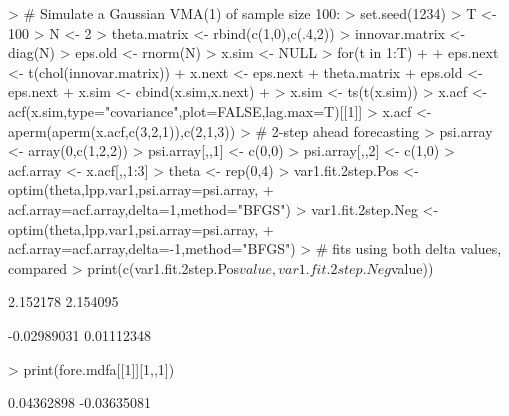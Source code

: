 \documentclass[a4paper]{book}
\begin{document}
\begin{Schunk}
\begin{Sinput}
> # Simulate a Gaussian VMA(1) of sample size 100:
> set.seed(1234)
> T <- 100
> N <- 2
> theta.matrix <- rbind(c(1,0),c(.4,2))
> innovar.matrix <- diag(N)
> eps.old <- rnorm(N)
> x.sim <- NULL
> for(t in 1:T)
+ {
+ 	eps.next <- t(chol(innovar.matrix)) %
+ 	x.next <- eps.next + theta.matrix %
+ 	eps.old <- eps.next
+ 	x.sim <- cbind(x.sim,x.next)
+ }
> x.sim <- ts(t(x.sim))
> x.acf <- acf(x.sim,type="covariance",plot=FALSE,lag.max=T)[[1]]
> x.acf <- aperm(aperm(x.acf,c(3,2,1)),c(2,1,3))
> # 2-step ahead forecasting
> psi.array <- array(0,c(1,2,2))
> psi.array[,,1] <- c(0,0)
> psi.array[,,2] <- c(1,0)
> acf.array <- x.acf[,,1:3]
> theta <- rep(0,4)
> var1.fit.2step.Pos <- optim(theta,lpp.var1,psi.array=psi.array,
+ 	acf.array=acf.array,delta=1,method="BFGS")
> var1.fit.2step.Neg <- optim(theta,lpp.var1,psi.array=psi.array,
+ 	acf.array=acf.array,delta=-1,method="BFGS")
> # fits using both delta values, compared
> print(c(var1.fit.2step.Pos$value,var1.fit.2step.Neg$value))		
\end{Sinput}
\begin{Soutput}
[1] 2.152178 2.154095
\end{Soutput}
\begin{Soutput}
[1] -0.02989031  0.01112348
\end{Soutput}
\begin{Sinput}
> print(fore.mdfa[[1]][1,,1])
\end{Sinput}
\begin{Soutput}
[1]  0.04362898 -0.03635081
\end{Soutput}
\end{Schunk}
\end{document}
